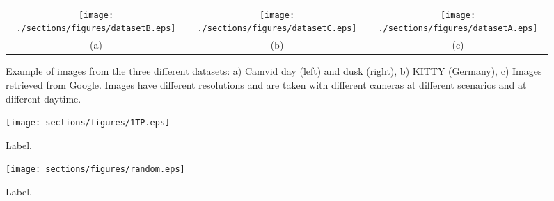 \begin{figure}[t!]
\begin{center}
\begin{tabular}{ccc}
\hspace{-0.05cm}\texttt{[image: ./sections/figures/datasetB.eps]}&
\hspace{-0.05cm}\texttt{[image: ./sections/figures/datasetC.eps]}&
\hspace{-0.05cm}\texttt{[image: ./sections/figures/datasetA.eps]}\\
(a)&(b)&(c)\\
\end{tabular}
\end{center}
\caption{Example of images from the three different datasets: a) Camvid day (left) and dusk (right), b) KITTY (Germany), c) Images retrieved from Google. Images have different resolutions and are taken with different cameras at different scenarios and at different daytime. } \label{fig:datasets}
\end{figure}
\begin{figure*}[!t]
	\centering
	\texttt{[image: sections/figures/1TP.eps]}
	\caption{Label.}
	\label{fig:1TP}
\end{figure*}


\begin{figure*}[!t]
	\centering
	\texttt{[image: sections/figures/random.eps]}
	\caption{Label.}
	\label{fig:random}
\end{figure*}


